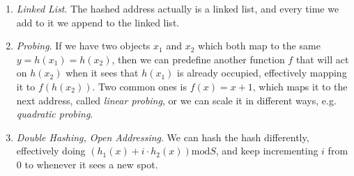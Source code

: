 \documentclass{article}
\begin{document}
    \begin{enumerate}
      \item \textit{Linked List}. The hashed address actually is a linked list, and every time we add to it we append to the linked list. 
      \item \textit{Probing}. If we have two objects $x_1$ and $x_2$ which both map to the same $y = h(x_1) = h(x_2)$, then we can predefine another function $f$ that will act on $h(x_2)$ when it sees that $h(x_1)$ is already occupied, effectively mapping it to $f(h(x_2))$. Two common ones is $f(x) = x + 1$, which maps it to the next address, called \textit{linear probing}, or we can scale it in different ways, e.g. \textit{quadratic probing}. 
      \item \textit{Double Hashing, Open Addressing}. We can hash the hash differently, effectively doing $(h_1(x) + i \cdot h_2(x)) \mathrm{mod} S$, and keep incrementing $i$ from $0$ to whenever it sees a new spot. 
    \end{enumerate}
\end{document}
